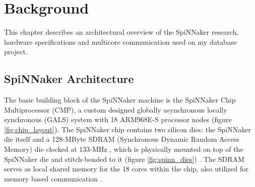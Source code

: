 \chapter{Background}
\label{cha:background}
This chapter describes an architectural overview of the SpiNNaker research, hardware specifications and multicore communication used on my database project.

\section{SpiNNaker Architecture}
\label{sec:spinn_arch}

The basic building block of the SpiNNaker machine is the SpiNNaker Chip Multiprocessor (CMP), a custom designed globally asynchronous locally synchronous (GALS) system \cite{painkras} with 18 ARM968E-S processor nodes \cite{impacttraffic} (figure \ref{fig:chip_layout}). 
The SpiNNaker chip contains two silicon dies: the SpiNNaker die itself and a 128-MByte SDRAM (Synchronous Dynamic Random Access Memory) die clocked at 133-MHz \cite{gals}, which is physically mounted on top of the SpiNNaker die and stitch-bonded to it (figure \ref{fig:spinn_dies}) \cite{spinnchip}. The SDRAM serves as local shared memory for the 18 cores within the chip, also utilized for memory based communication \cite{datasheet}. 

